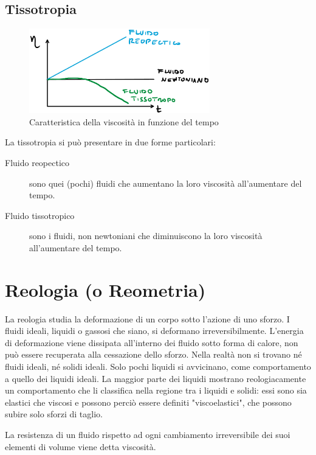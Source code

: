 \section{Tissotropia}
\begin{figure}
\includegraphics[width = 0.7\textwidth]{gfx/Tissotropia}
\caption{Caratteristica della viscosità in funzione del tempo}
\label{fig:Tissotropia}
\end{figure}
La tissotropia si può presentare in due forme particolari:
\begin{description}
\item[Fluido reopectico] sono quei (pochi) fluidi che aumentano la loro viscosità all'aumentare del tempo.
\item[Fluido tissotropico] sono i fluidi, non newtoniani che diminuiscono la loro viscosità all'aumentare del tempo.
\end{description}

\chapter{Reologia (o Reometria)}\label{chp:Reologia}
La reologia studia la deformazione di un corpo sotto l'azione di uno sforzo.
I fluidi ideali, liquidi o gassosi che siano, si deformano irreversibilmente. L'energia di deformazione viene dissipata all'interno dei fluido sotto forma di calore, non può essere recuperata alla cessazione dello sforzo. Nella realtà non si trovano né fluidi ideali, né solidi ideali.
Solo pochi liquidi si avvicinano, come comportamento a quello dei liquidi ideali. La maggior parte dei liquidi mostrano reologiacamente un comportamento che li classifica nella regione tra i liquidi e solidi: essi sono sia elastici che viscosi e possono perciò essere definiti "viscoelastici", che possono subire solo sforzi di taglio.

La resistenza di un fluido rispetto ad ogni cambiamento irreversibile dei suoi elementi di volume viene detta viscosità.

